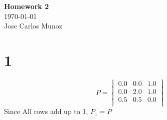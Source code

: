 \documentclass[12pt,english]{article}
\begin{document}
\begin{center}
    \Large
    \textbf{Homework 2}\\
    \small
    \today\\
    \large
    Jose Carlos Munoz
\end{center}
\section*{1}
\begin{equation*}
P =
\begin{vmatrix}
0.0 & 0.0 & 1.0\\
0.0 & 2.0 & 1.0\\
0.5 & 0.5 & 0.0\\
\end{vmatrix}
\end{equation*}
Since All rows add up to 1, $P_1 = P$\\
\end{document}

